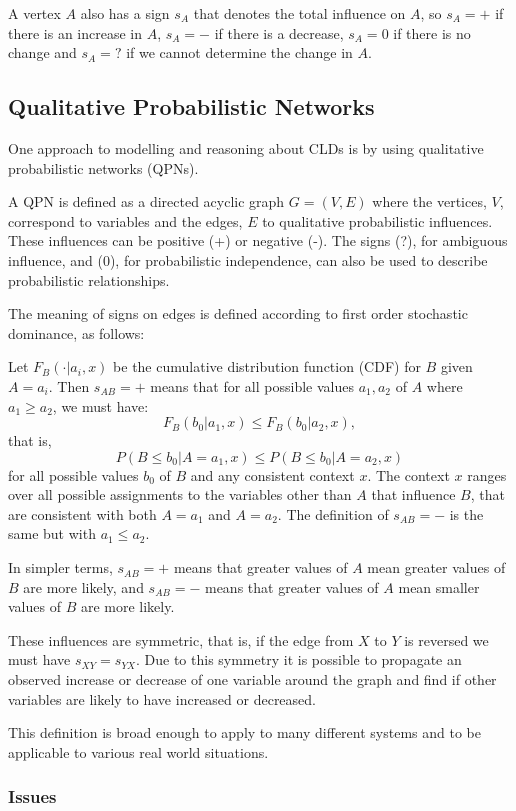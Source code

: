 A vertex $A$ also has a sign $s_A$ that denotes the total influence on
$A$, so $s_A=+$ if there is an increase in $A$, $s_A=-$ if there is a
decrease, $s_A=0$ if there is no change and $s_A=?$ if we cannot
determine the change in $A$.

\subsection{Qualitative Probabilistic Networks}
One approach to modelling and reasoning about CLDs is by using
qualitative probabilistic networks (QPNs).

A QPN \cite{Wellman} is defined as a directed acyclic graph $G=(V,E)$
where the vertices, $V$, correspond to variables and the edges, $E$ to
qualitative probabilistic influences.
%
These influences can be positive (+) or negative (-).
%
The signs (?), for ambiguous influence, and (0), for probabilistic
independence, can also be used to describe probabilistic
relationships.

The meaning of signs on edges is defined according to first order
stochastic dominance, as follows:

Let $F_B(\cdot|a_i, x)$ be the cumulative distribution function (CDF)
for $B$ given $A=a_i$.
%
Then $s_{AB}=+$ means that for all possible values $a_1,a_2$ of $A$
where $a_1\geq a_2$, we must have:
%
\[F_B(b_0|a_1, x)\leq F_B(b_0|a_2, x),\]
%
that is,
%
\[P(B \leq b_0| A = a_1, x)\leq P(B\leq b_0| A = a_2, x)\]
%
for all possible values $b_0$ of $B$ and any consistent context $x$.
%
The context $x$ ranges over all possible assignments to the variables
other than $A$ that influence $B$, that are consistent with both
$A=a_1$ and $A=a_2$.
%
The definition of $s_{AB}=-$ is the same but with $a_1\leq a_2$.

In simpler terms, $s_{AB} = +$ means that greater values of $A$ mean
greater values of $B$ are more likely, and $s_{AB}=-$ means that
greater values of $A$ mean smaller values of $B$ are more likely.

These influences are symmetric, that is, if the edge from $X$ to $Y$
is reversed we must have $s_{XY} = s_{YX}$.
%
Due to this symmetry it is possible to propagate an observed increase
or decrease of one variable around the graph and find if other
variables are likely to have increased or decreased.

This definition is broad enough to apply to many different systems and
to be applicable to various real world situations.

\subsubsection{Issues} \label{qpnIssues}

